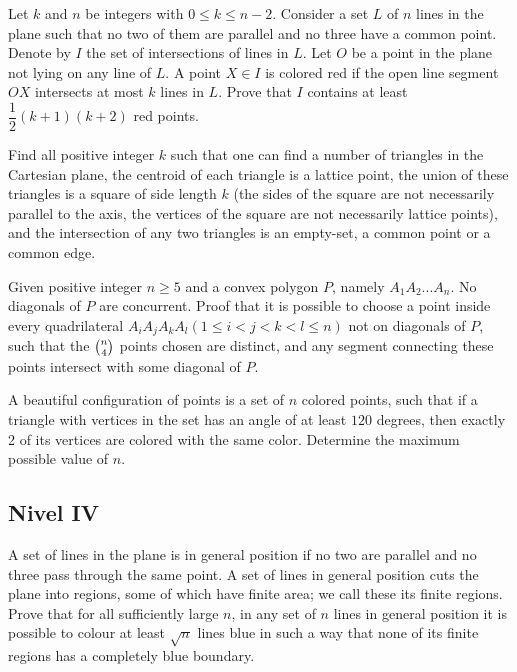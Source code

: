 \documentclass[11pt]{scrartcl}
\begin{document}
\begin{problem} 
    Let $ k$ and $ n$ be integers with $ 0\le k\le n - 2$. Consider a set $ L$ of $ n$ lines in the plane such that no two of them are parallel and no three have a common point. Denote by $ I$ the set of intersections of lines in $ L$. Let $ O$ be a point in the plane not lying on any line of $ L$. A point $ X\in I$ is colored red if the open line segment $ OX$ intersects at most $ k$ lines in $ L$. Prove that $ I$ contains at least $ \dfrac{1}{2}(k + 1)(k + 2)$ red points.
\end{problem}

\begin{problem} 
    Find all positive integer $k$ such that one can find a number of triangles in the Cartesian plane, the centroid of each triangle is a lattice point, the union of these triangles is a square of side length $k$ (the sides of the square are not necessarily parallel to the axis, the vertices of the square are not necessarily lattice points), and the intersection of any two triangles is an empty-set, a common point or a common edge.
\end{problem}

\begin{problem} 
    	Given positive integer $ n \ge 5 $ and a convex polygon $P$, namely $ A_1A_2...A_n $. No diagonals of $P$ are concurrent. Proof that it is possible to choose a point inside every quadrilateral $ A_iA_jA_kA_l (1\le i<j<k<l\le n) $ not on diagonals of $P$, such that the $ \tbinom{n}{4} $ points chosen are distinct, and any segment connecting these points intersect with some diagonal of $P$.
\end{problem}

\begin{problem} [Ibero 2013/6]
    A beautiful configuration of points is a set of $n$ colored points, such that if a triangle with vertices in the set has an angle of at least $120$ degrees, then exactly 2 of its vertices are colored with the same color. Determine the maximum possible value of $n$.
\end{problem}

\subsection{Nivel IV}

\begin{problem} [IMO 2014/6]
    A set of lines in the plane is in general position if no two are parallel and no three pass through the same point. A set of lines in general position cuts the plane into regions, some of which have finite area; we call these its finite regions. Prove that for all sufficiently large $n$, in any set of $n$ lines in general position it is possible to colour at least $\sqrt{n}$ lines blue in such a way that none of its finite regions has a completely blue boundary.
\end{problem}
\end{document}
